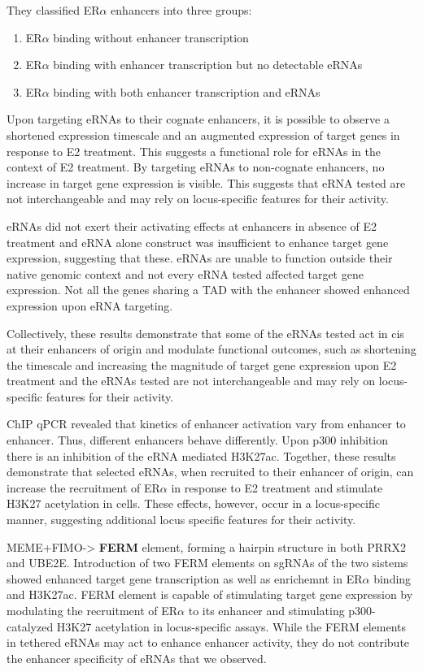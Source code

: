 They classified ER$\alpha$ enhancers into three groups:
\begin{enumerate}
\tightlist
\item ER$\alpha$ binding without enhancer transcription
\item ER$\alpha$ binding with enhancer transcription but
no detectable eRNAs
\item ER$\alpha$ binding with both enhancer transcription
and eRNAs
\end{enumerate}

Upon targeting eRNAs to their cognate
enhancers, it is possible to observe a
shortened expression timescale and an
augmented expression of target genes in
response to E2 treatment.
This suggests a functional role for eRNAs in the context of E2 treatment.
By targeting eRNAs to non-cognate enhancers, no
increase in target gene expression is visible.
This suggests that eRNA tested are not
interchangeable and may rely on locus-specific features for their activity.

eRNAs did not exert their activating effects at enhancers in absence of E2 treatment and eRNA alone construct was insufficient to enhance target gene expression, suggesting that these.
eRNAs are unable to function outside their native genomic context and not every eRNA tested affected target gene expression.
Not all the genes sharing a TAD with the enhancer showed enhanced expression upon eRNA
targeting.

Collectively, these results demonstrate that some of the eRNAs tested act in cis at their enhancers of origin and
modulate functional outcomes, such as shortening the timescale
and increasing the magnitude of target gene expression upon E2
treatment and the eRNAs tested are not interchangeable and may rely on locus-
specific features for their activity.

ChIP qPCR revealed that kinetics of enhancer
activation vary from enhancer to
enhancer. Thus, different enhancers
behave differently. Upon p300 inhibition there is an inhibition of the eRNA mediated H3K27ac.
Together, these results demonstrate that selected eRNAs, when
recruited to their enhancer of origin, can increase the recruitment of
ER$\alpha$ in response to E2 treatment and stimulate H3K27 acetylation in
cells. These effects, however, occur in a locus-specific manner,
suggesting additional locus specific features for their activity.

MEME+FIMO-> \textbf{FERM} element, forming a hairpin structure in both PRRX2 and UBE2E. Introduction of two FERM elements on
sgRNAs of the two sistems showed enhanced target gene transcription as well as enrichemnt in ER$\alpha$ binding and H3K27ac.
FERM element is capable of stimulating target gene expression by
modulating the recruitment of ER$\alpha$ to its enhancer and stimulating
p300- catalyzed H3K27 acetylation in locus-specific assays.
While the FERM elements in tethered eRNAs may act to enhance
enhancer activity, they do not contribute the enhancer specificity of
eRNAs that we observed.

